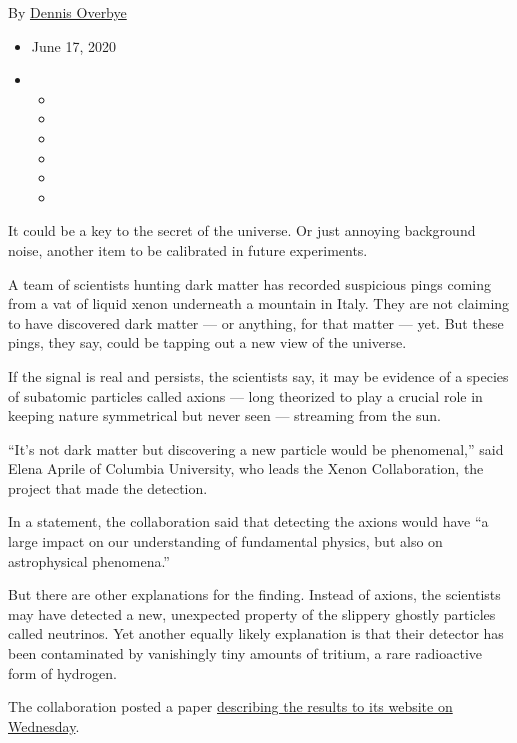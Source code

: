 By \href{https://www.nytimes3xbfgragh.onion/by/dennis-overbye}{Dennis
Overbye}

\begin{itemize}
\item
  June 17, 2020
\item
  \begin{itemize}
  \item
  \item
  \item
  \item
  \item
  \item
  \end{itemize}
\end{itemize}

It could be a key to the secret of the universe. Or just annoying
background noise, another item to be calibrated in future experiments.

A team of scientists hunting dark matter has recorded suspicious pings
coming from a vat of liquid xenon underneath a mountain in Italy. They
are not claiming to have discovered dark matter --- or anything, for
that matter --- yet. But these pings, they say, could be tapping out a
new view of the universe.

If the signal is real and persists, the scientists say, it may be
evidence of a species of subatomic particles called axions --- long
theorized to play a crucial role in keeping nature symmetrical but never
seen --- streaming from the sun.

``It's not dark matter but discovering a new particle would be
phenomenal,'' said Elena Aprile of Columbia University, who leads the
Xenon Collaboration, the project that made the detection.

In a statement, the collaboration said that detecting the axions would
have ``a large impact on our understanding of fundamental physics, but
also on astrophysical phenomena.''

But there are other explanations for the finding. Instead of axions, the
scientists may have detected a new, unexpected property of the slippery
ghostly particles called neutrinos. Yet another equally likely
explanation is that their detector has been contaminated by vanishingly
tiny amounts of tritium, a rare radioactive form of hydrogen.

The collaboration posted a paper
\href{http://science.purdue.edu/xenon1t/wp-content/uploads/2020/06/xenon1tlowersearches.pdf}{describing
the results to its website on Wednesday}.

